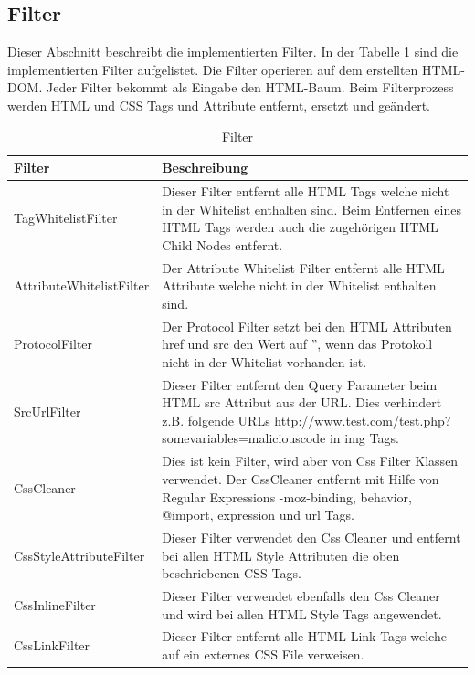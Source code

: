 \newpage
\subsection{Filter}

Dieser Abschnitt beschreibt die implementierten Filter. 
In der Tabelle \ref{tab:filter} sind die implementierten Filter aufgelistet. Die Filter operieren auf dem erstellten HTML-DOM.
Jeder Filter bekommt als Eingabe den HTML-Baum. Beim Filterprozess werden HTML und CSS Tags und Attribute entfernt, ersetzt und geändert.
\newline
\begin{table}[H]
\begin{center}
\begin{tabular}{l p{10.5cm} }
\hline
\textbf{Filter} & \textbf{Beschreibung} \\ \hline \hline
TagWhitelistFilter & Dieser Filter entfernt alle HTML Tags welche nicht in der Whitelist enthalten sind. 
Beim Entfernen eines HTML Tags werden auch die zugehörigen HTML Child Nodes entfernt. \\ 

AttributeWhitelistFilter & Der Attribute Whitelist Filter entfernt alle HTML Attribute welche nicht in der Whitelist enthalten sind. \\

ProtocolFilter & Der Protocol Filter setzt bei den HTML Attributen href und src den Wert auf '', wenn das Protokoll nicht in der Whitelist vorhanden ist. \\

SrcUrlFilter & Dieser Filter entfernt den Query Parameter beim HTML src Attribut aus der URL. Dies verhindert z.B. folgende URLs http://www.test.com/test.php?somevariables=maliciouscode in img Tags. \\

CssCleaner & Dies ist kein Filter, wird aber von Css Filter Klassen verwendet. Der CssCleaner entfernt mit Hilfe von Regular Expressions -moz-binding, behavior, @import, expression und url Tags. \\

CssStyleAttributeFilter & Dieser Filter verwendet den Css Cleaner und entfernt bei allen HTML Style Attributen die oben beschriebenen CSS Tags. \\

CssInlineFilter & Dieser Filter verwendet ebenfalls den Css Cleaner und wird bei allen HTML Style Tags angewendet. \\

CssLinkFilter & Dieser Filter entfernt alle HTML Link Tags welche auf ein externes CSS File verweisen. \\

\hline \hline
\end{tabular}
\caption{Filter}
\label{tab:filter}
\end{center}
\end{table}

